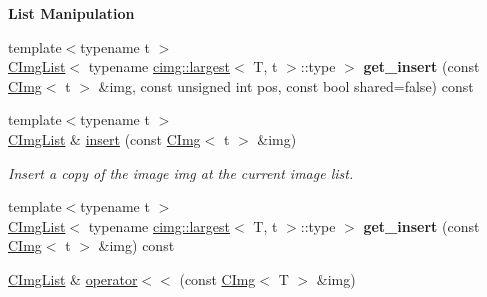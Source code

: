 \begin{Indent}{\bf List Manipulation}
\begin{DoxyCompactItemize}
\item 
\hypertarget{structcimg__library_1_1_c_img_list_a1dd3b37a277b24d18bc73ab9ef1ea633}{
{\footnotesize template$<$typename t $>$ }\\\hyperlink{structcimg__library_1_1_c_img_list}{CImgList}$<$ typename \hyperlink{structcimg__library_1_1cimg_1_1largest}{cimg::largest}$<$ T, t $>$::type $>$ {\bfseries get\_\-insert} (const \hyperlink{structcimg__library_1_1_c_img}{CImg}$<$ t $>$ \&img, const unsigned int pos, const bool shared=false) const }
\label{structcimg__library_1_1_c_img_list_a1dd3b37a277b24d18bc73ab9ef1ea633}

\item 
\hypertarget{structcimg__library_1_1_c_img_list_a96d682ff9f621eae0143bf2b60ae7289}{
{\footnotesize template$<$typename t $>$ }\\\hyperlink{structcimg__library_1_1_c_img_list}{CImgList} \& \hyperlink{structcimg__library_1_1_c_img_list_a96d682ff9f621eae0143bf2b60ae7289}{insert} (const \hyperlink{structcimg__library_1_1_c_img}{CImg}$<$ t $>$ \&img)}
\label{structcimg__library_1_1_c_img_list_a96d682ff9f621eae0143bf2b60ae7289}

\begin{DoxyCompactList}\small\item\em Insert a copy of the image {\ttfamily img} at the current image list. \item\end{DoxyCompactList}\item 
\hypertarget{structcimg__library_1_1_c_img_list_ad42535191ffc4489977138a2e062f969}{
{\footnotesize template$<$typename t $>$ }\\\hyperlink{structcimg__library_1_1_c_img_list}{CImgList}$<$ typename \hyperlink{structcimg__library_1_1cimg_1_1largest}{cimg::largest}$<$ T, t $>$::type $>$ {\bfseries get\_\-insert} (const \hyperlink{structcimg__library_1_1_c_img}{CImg}$<$ t $>$ \&img) const }
\label{structcimg__library_1_1_c_img_list_ad42535191ffc4489977138a2e062f969}

\item 
\hypertarget{structcimg__library_1_1_c_img_list_a83e0807a3f965020865146caaf47aff9}{
\hyperlink{structcimg__library_1_1_c_img_list}{CImgList} \& \hyperlink{structcimg__library_1_1_c_img_list_a83e0807a3f965020865146caaf47aff9}{operator$<$$<$} (const \hyperlink{structcimg__library_1_1_c_img}{CImg}$<$ T $>$ \&img)}
\label{structcimg__library_1_1_c_img_list_a83e0807a3f965020865146caaf47aff9}


\end{DoxyCompactItemize}
\end{Indent}

